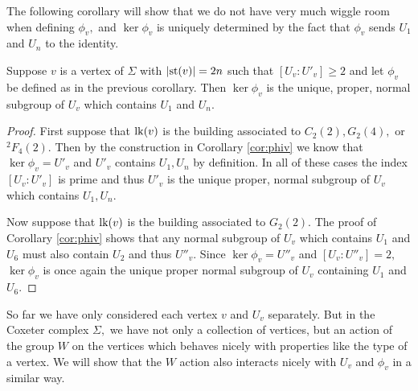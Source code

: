 \documentclass[class=book, crop=false,12 pt]{standalone}
\begin{document}
The following corollary will show that we do not have very much wiggle room when defining $\phi_v,$ and $\ker \phi_v$ is uniquely determined by the fact that $\phi_v$ sends $U_1$ and $U_n$ to the identity.
\begin{cor}
	\label{cor:uniquephiv}
	Suppose $v$ is a vertex of $\Sigma$ with $|\mathrm{st}(v)|=2n$ such that $[U_v:U'_v]\ge 2$ and let $\phi_v$ be defined as in the previous corollary. Then $\ker \phi_v$ is the unique, proper, normal subgroup of $U_v$ which contains $U_1$ and $U_n.$
\end{cor}
\begin{proof}
	First suppose that $\mathrm{lk}(v)$ is the building associated to $C_2(2),G_2(4),$ or ${}^2F_4(2).$ Then by the construction in Corollary \ref{cor:phiv} we know that $\ker \phi_v=U'_v$ and $U'_v$ contains $U_1,U_n$ by definition. In all of these cases the index $[U_v:U'_v]$ is prime and thus $U'_v$ is the unique proper, normal subgroup of $U_v$ which contains $U_1,U_n.$

	Now suppose that $\mathrm{lk}(v)$ is the building associated to $G_2(2).$ The proof of Corollary \ref{cor:phiv} shows that any normal subgroup of $U_v$ which contains $U_1$ and $U_6$ must also contain $U_2$ and thus $U''_v.$ Since $\ker \phi_v=U''_v$ and $[U_v:U''_v]=2,$ $\ker\phi_v$ is once again the unique proper normal subgroup of $U_v$ containing $U_1$ and $U_6.$
\end{proof}

So far we have only considered each vertex $v$ and $U_v$ separately. But in the Coxeter complex $\Sigma,$ we have not only a collection of vertices, but an action of the group $W$ on the vertices which behaves nicely with properties like the type of a vertex. We will show that the $W$ action also interacts nicely with $U_v$ and $\phi_v$ in a similar way.
\end{document}
